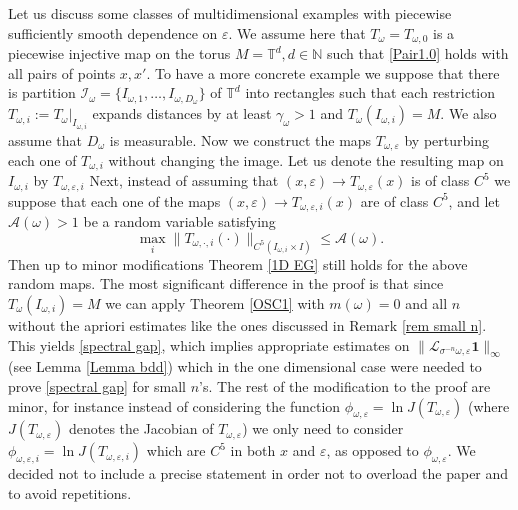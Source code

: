 \documentclass[11pt,reqno,a4paper]{article}
\theoremstyle{special}
\def\N{\mathbb{N}}
\def\om{\omega}
\begin{document}
Let us discuss some classes of multidimensional examples with piecewise sufficiently smooth dependence  on $\varepsilon$. We assume here that $T_\om=T_{\omega, 0}$ is a piecewise injective map on the torus $M=\mathbb T^d, d\in\N$ such that 
\eqref{Pair1.0} holds with all pairs of points $x,x'$. To have a more concrete example we suppose that there is  partition $\mathcal I_\om=\{I_{\om,1},\ldots ,I_{\om,D_\om}\}$ of $\mathbb T^d$ into rectangles such that each restriction $T_{\om, i}:=T_\om|_{I_{\om,i}}$  expands distances by at least $\gamma_\om>1$ and $T_\om(I_{\om,i})=M$. We also assume that $D_\om$ is measurable. Now we construct the maps $T_{\om, \varepsilon}$ by perturbing each one of $T_{\om, i}$ without changing the image. Let us denote the resulting map on $I_{\om,i}$ by $T_{\om,\varepsilon,i}$
 Next, instead of assuming that $(x,\varepsilon)\to T_{\om,\varepsilon}(x)$ is of class $C^5$ we suppose that each one of the maps $(x,\varepsilon)\to T_{\om,\varepsilon,i}(x)$ are of class $C^5$, and let $\mathcal A(\om)>1$ be a random variable satisfying 
$$
\max_{i}\|T_{\om,\cdot,i}(\cdot)\|_{C^5(I_{\om,i}\times I)}\leq \mathcal A(\om).
$$
Then up to minor modifications Theorem \ref{1D EG}
 still holds for the above random maps. 
The most significant difference in the proof is that 
since $T_\om(I_{\om,i})=M$ we can  apply Theorem \ref{OSC1} with $m(\om)=0$ and all $n$ without the apriori estimates like the ones discussed in Remark \ref{rem small n}.
 This yields \eqref{spectral gap}, which implies appropriate estimates on $\|\mathcal L_{\sigma^{-n}\om,\varepsilon}\textbf{1}\|_\infty$ (see Lemma \ref{Lemma bdd}) which in the one dimensional case were needed to prove \eqref{spectral gap} for small $n$'s. The rest of the modification to the proof are minor, for instance instead of considering the function $\phi_{\om,\varepsilon}=\ln J(T_{\om,\varepsilon})$ (where $J(T_{\om, \varepsilon})$ denotes the Jacobian of $T_{\omega, \varepsilon}$)  we only need to consider $\phi_{\om,\varepsilon,i}=\ln J(T_{\om,\varepsilon,i})$  which are $C^5$ in both $x$ and $\varepsilon$, as opposed to $\phi_{\om,\varepsilon}$. We decided not to include a precise statement in order not to overload the paper and to avoid repetitions.
\end{document}
